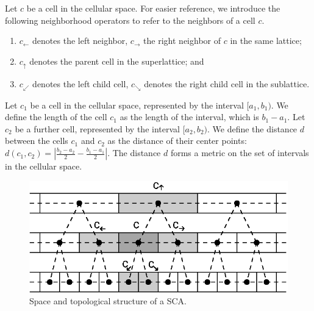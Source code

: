 \documentclass[pre,amssymb,showpacs,showkeys,preprint]{revtex4}
\begin{document}
Let $c$ be a cell in the cellular space.
For easier reference, we introduce the following neighborhood operators to refer to the neighbors
of a cell $c$.
\begin{enumerate}
\item $c_{\leftarrow}$ denotes the left neighbor, $c_{\rightarrow}$ the right neighbor of $c$ in
the same lattice;
\item $c_{\uparrow}$ denotes the parent cell in the superlattice; and
\item $c_{\swarrow}$ denotes the left child cell, $c_{\searrow}$ denotes the right child cell
in the sublattice.
\end{enumerate}

Let $c_1$ be a cell in the cellular space, represented by the interval $[a_1, b_1)$.
We define the length of the cell $c_1$ as the length of the interval, which is $b_1 - a_1$.
Let $c_2$ be a further cell, represented by
the interval $[a_2, b_2)$.
We define the distance $d$ between the cells $c_1$ and $c_2$ as the distance of their center points:
$d(c_1, c_2) = |\frac{b_2 - a_2}{2} - \frac{b_1 - a_1}{2}|$.
The distance $d$ forms a metric on the set of intervals in the cellular space.

\begin{figure}
\begin{center}
\includegraphics{2006-sica-OneDimInteraction2.eps}
\caption{\label{fig:1-dim-interaction} Space and topological structure of a SCA.}
\end{center}
\end{figure}

\end{document}
